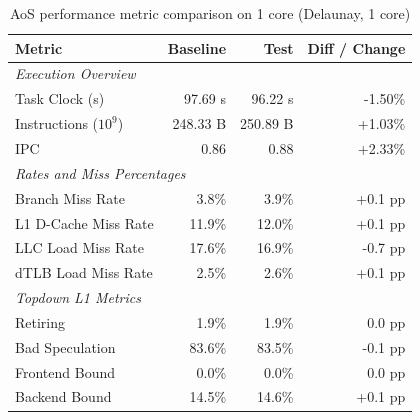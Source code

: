 \begin{table}[htbp]
  \centering
  \caption{AoS performance metric comparison on 1 core (Delaunay, 1 core)}
  \label{tab:perf_comparison_aos_delaunay_1core}
  \begin{tabular}{lrrr}
    \toprule
    \textbf{Metric} & \textbf{Baseline} & \textbf{Test} & \textbf{Diff / Change} \\
    \midrule
    \multicolumn{4}{l}{\textit{Execution Overview}} \\
    \quad Task Clock (s)           & 97.69 s   & 96.22 s   & -1.50\%   \\
    \quad Instructions ($10^9$)    & 248.33 B  & 250.89 B  & +1.03\%   \\
    \quad IPC                      & 0.86       & 0.88       & +2.33\%    \\
    \midrule
    \multicolumn{4}{l}{\textit{Rates and Miss Percentages}} \\
    \quad Branch Miss Rate         & 3.8\%      & 3.9\%      & +0.1 pp     \\
    \quad L1 D-Cache Miss Rate     & 11.9\%      & 12.0\%      & +0.1 pp    \\
    \quad LLC Load Miss Rate       & 17.6\%     & 16.9\%     & -0.7 pp    \\
    \quad dTLB Load Miss Rate      & 2.5\%      & 2.6\%      & +0.1 pp     \\
    \midrule
    \multicolumn{4}{l}{\textit{Topdown L1 Metrics}} \\
    \quad Retiring                 & 1.9\%      & 1.9\%      & 0.0 pp    \\
    \quad Bad Speculation          & 83.6\%     & 83.5\%     & -0.1 pp   \\
    \quad Frontend Bound           & 0.0\%      & 0.0\%      & 0.0 pp    \\
    \quad Backend Bound            & 14.5\%      & 14.6\%      & +0.1 pp    \\
    \bottomrule
  \end{tabular}
\end{table}

